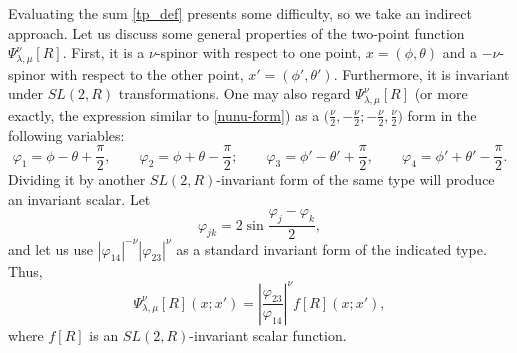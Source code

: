 \documentclass[12pt]{article}
\newcommand{\vp}{\varphi}
\newcommand{\RR}{\mathbb{R}}
\DeclareMathOperator{\SL}{SL}
\def\widetilde#1{#1}%
\def\SL{SL}
\def\RR{R}
\begin{document}
Evaluating the sum \eqref{tp_def} presents some difficulty, so we take an indirect approach. Let us discuss some general properties of the two-point function $\Psi^{\nu}_{\lambda,\mu}[R]$. First, it is a $\nu$-spinor with respect to one point, $x=(\phi,\theta)$ and a $-\nu$-spinor with respect to the other point, $x'=(\phi',\theta')$. Furthermore, it is invariant under $\widetilde{\SL}(2,\RR)$ transformations. One may also regard $\Psi^{\nu}_{\lambda,\mu}[R]$ (or more exactly, the expression similar to \eqref{nunu-form}) as a $\bigl(\frac{\nu}{2},-\frac{\nu}{2}; -\frac{\nu}{2},\frac{\nu}{2}\bigr)$ form in the following variables:
\begin{equation}
\vp_1=\phi-\theta+\frac{\pi}{2},\qquad
\vp_2=\phi+\theta-\frac{\pi}{2};\qquad
\vp_3=\phi'-\theta'+\frac{\pi}{2},\qquad
\vp_4=\phi'+\theta'-\frac{\pi}{2}.
\end{equation}
Dividing it by another $\widetilde{\SL}(2,\RR)$-invariant form of the same type will produce an invariant scalar. Let
\begin{equation}
\vp_{jk}=2\sin\frac{\vp_j-\vp_k}{2},
\end{equation}
and let us use $|\vp_{14}|^{-\nu}|\vp_{23}|^{\nu}$ as a standard invariant form of the indicated type. Thus,
\begin{equation}\label{tPsi_f}
\Psi^{\nu}_{\lambda,\mu}[R](x;x')
=\left|\frac{\vp_{23}}{\vp_{14}}\right|^{\nu} f[R](x;x'),
\end{equation}
where $f[R]$ is an $\widetilde{\SL}(2,\RR)$-invariant scalar function.
\end{document}
